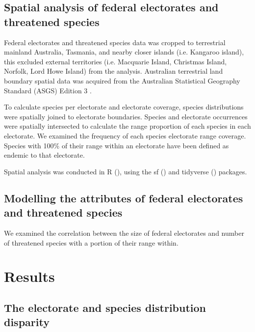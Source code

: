 \documentclass[a4paper,11pt]{article}
\begin{document}
\subsection{Spatial analysis of federal electorates and threatened species}

Federal electorates and threatened species data was cropped to terrestrial mainland Australia, Tasmania, and nearby closer islands (i.e. Kangaroo island), this excluded external territories (i.e. Macquarie Island, Christmas Island, Norfolk, Lord Howe Island) from the analysis. Australian terrestrial land boundary spatial data was acquired from the Australian Statistical Geography Standard (ASGS) Edition 3 \cite{australianbureauofstatisticsAustralianStatisticalGeography2021}. 

To calculate species per electorate and electorate coverage, species distributions were spatially joined to electorate boundaries. Species and electorate occurrences were spatially intersected to calculate the range proportion of each species in each electorate.
We examined the frequency of each species electorate range coverage.
Species with 100\% of their range within an electorate have been defined as endemic to that electorate. 

Spatial analysis was conducted in R (\cite{rcoreteamLanguageEnvironmentStatistical2021}), using the sf (\cite{pebesmaSimpleFeaturesStandardized2018}) and tidyverse (\cite{wickhamWelcomeTidyverse2019}) packages. 

\subsection{Modelling the attributes of federal electorates and threatened species}

We examined the correlation between the size of federal electorates and number of threatened species with a portion of their range within.

\section{Results}

\subsection{The electorate and species distribution disparity} 

\end{document}
